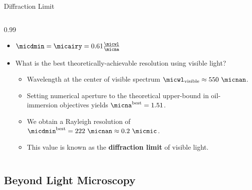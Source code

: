 \begin{frame}[c]{Diffraction Limit}
	\begin{columns}[T,onlytextwidth]

		\begin{column}{0.99\textwidth}
			\begin{itemize}
				\setlength\itemsep{0.4cm}
				\item<1-> $\micdmin = \micairy = 0.61\frac{\micwl}{\micna}$

				\item<2-> What is the best theoretically-achievable resolution using visible light?
				      \vspace{0.4cm}

				      \begin{itemize}
					      \setlength\itemsep{0.4cm}
					      \item<3-> Wavelength at the center of visible spectrum $\micwl_{\text{visible}} \approx 550~\micnan$.
					      \item<4-> Setting numerical aperture to the theoretical upper-bound in oil-immersion objectives yields $\micna^{\text{best}} = 1.51$.
					      \item<5-> We obtain a Rayleigh resolution of $\micdmin^{\text{best}} = 222~\micnan \approx 0.2~\micmic$.
					      \item<6-> This value is known as the \textbf{diffraction limit} of visible light.
				      \end{itemize}
			\end{itemize}
		\end{column}


	\end{columns}
\end{frame}


\subsection{Beyond Light Microscopy}%
\label{sub:beyond_light_microscopy}


